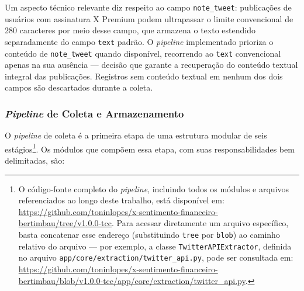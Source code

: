 Um aspecto técnico relevante diz respeito ao campo \texttt{note\_tweet}: publicações de usuários com assinatura X Premium podem ultrapassar o limite convencional de 280 caracteres por meio desse campo, que armazena o texto estendido separadamente do campo \texttt{text} padrão. O \textit{pipeline} implementado prioriza o conteúdo de \texttt{note\_tweet} quando disponível, recorrendo ao \texttt{text} convencional apenas na sua ausência — decisão que garante a recuperação do conteúdo textual integral das publicações. Registros sem conteúdo textual em nenhum dos dois campos são descartados durante a coleta.

\subsubsection{\textit{Pipeline} de Coleta e Armazenamento}
\label{subsubsec:pipeline_coleta}

O \textit{pipeline} de coleta é a primeira etapa de uma estrutura modular de seis estágios\footnote{O código-fonte completo do \textit{pipeline}, incluindo todos os módulos e arquivos referenciados ao longo deste trabalho, está disponível em: \url{https://github.com/toninlopes/x-sentimento-financeiro-bertimbau/tree/v1.0.0-tcc}. Para acessar diretamente um arquivo específico, basta concatenar esse endereço (substituindo \texttt{tree} por \texttt{blob}) ao caminho relativo do arquivo — por exemplo, a classe \texttt{TwitterAPIExtractor}, definida no arquivo \texttt{app/core/extraction/twitter\_api.py}, pode ser consultada em: \url{https://github.com/toninlopes/x-sentimento-financeiro-bertimbau/blob/v1.0.0-tcc/app/core/extraction/twitter_api.py}.}. Os módulos que compõem essa etapa, com suas responsabilidades bem delimitadas, são:

